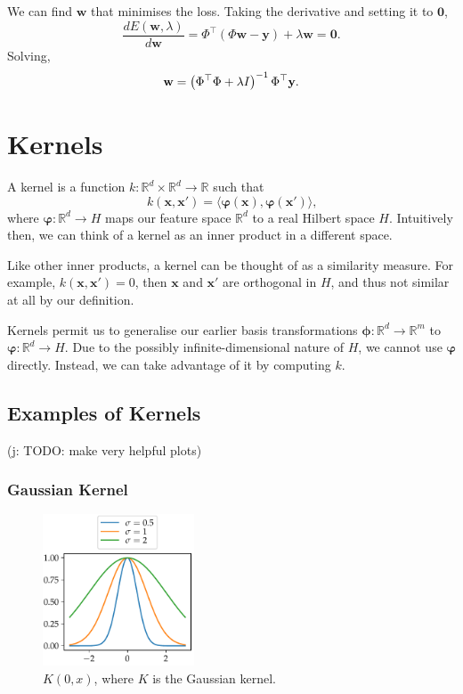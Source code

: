 \documentclass[11pt,twoside]{report}
\newcommand\bw{\mathbf{w}}
\newcommand\bx{\mathbf{x}}
\newcommand\by{\mathbf{y}}
\newcommand\bphi{\bm{\phi}}
\newcommand\bvarphi{\bm{\varphi}}
\newcommand\bbR{\mathbb{R}}
\newcommand\jakub[1]{{\color{red}(j: #1)}}
\begin{document}
We can find $\bw$ that minimises the loss. Taking the derivative and setting it to $\mathbf{0}$,\[
    \frac{dE(\bw, \lambda)}{d\bw} = \Phi^\top(\Phi\bw - \by) + \lambda \bw = \mathbf{0} \text{.}
\] Solving,\[
    \bw = \left(\Phi^\top\Phi + \lambda I\right)^{-1}\Phi^\top\by \text.
\]

\section{Kernels}

A kernel is a function $k : \bbR^d \times \bbR^d \to \bbR$ such that \[
    k(\bx, \bx') = \langle \bvarphi\left(\bx\right), \bvarphi\left(\bx'\right)\rangle \text{,}
\] where $\bvarphi : \bbR^d \to H$ maps our feature space $\bbR^d$ to a real Hilbert space $H$. Intuitively then, we can think of a kernel as an inner product in a different space.

Like other inner products, a kernel can be thought of as a similarity measure. For example, $k(\bx, \bx') = 0$, then $\bx$ and $\bx'$ are orthogonal in $H$, and thus not similar at all by our definition.

Kernels permit us to generalise our earlier basis transformations $\bphi : \bbR^d \to \bbR^m$ to $\bvarphi : \bbR^d \to H$. Due to the possibly infinite-dimensional nature of $H$, we cannot use $\bvarphi$ directly. Instead, we can take advantage of it by computing $k$.

\subsection{Examples of Kernels}

\jakub{TODO: make very helpful plots}

\subsubsection{Gaussian Kernel}

  \begin{figure}
    \centering
    \includegraphics[width=0.4\textwidth]{gaussian_kernel_plot.pdf}
    \caption{$K(0, x)$, where $K$ is the Gaussian kernel.}
    \label{fig:gaussian_kernel}
  \end{figure}
\end{document}
